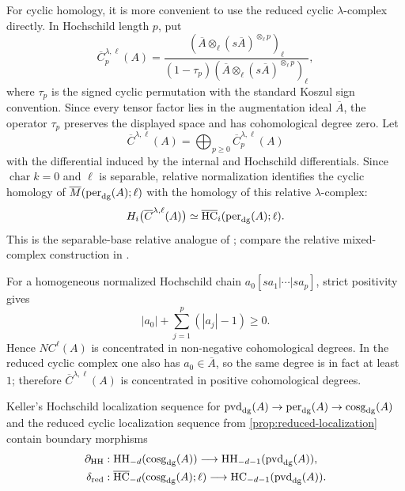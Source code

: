 \documentclass[11pt,a4paper,dvipsnames,x11names]{amsart}
\begin{document}
For cyclic homology, it is more convenient to use the reduced cyclic $\lambda$-complex directly. In Hochschild length $p$, put
\[
\overline C_p^{\lambda,\ell}(A)
=
\frac{\left(\overline A\otimes_{\ell}(s\overline A)^{\otimes_{\ell}p}\right)_{\ell}}
{(1-\tau_p)\left(\overline A\otimes_{\ell}(s\overline A)^{\otimes_{\ell}p}\right)_{\ell}},
\]
where $\tau_p$ is the signed cyclic permutation with the standard Koszul sign convention. Since every tensor factor lies in the augmentation ideal $\overline A$, the operator $\tau_p$ preserves the displayed space and has cohomological degree zero. Let
\[
\overline C^{\lambda,\ell}(A)=\bigoplus_{p\geq0}\overline C_p^{\lambda,\ell}(A)
\]
with the differential induced by the internal and Hochschild differentials. Since $\operatorname{char}k=0$ and $\ell$ is separable, relative normalization identifies the cyclic homology of $\overline M(\operatorname{per}_{\mathrm{dg}}(A);\ell)$ with the homology of this relative $\lambda$-complex:
\begin{equation}\label{eq:relative-HC-model}
H_i\bigl(\overline C^{\lambda,\ell}(A)\bigr)
\simeq
\overline{\operatorname{HC}}_i(\operatorname{per}_{\mathrm{dg}}(A);\ell).
\end{equation}
This is the separable-base relative analogue of \cite[Proposition~2.2.14]{Loday98}; compare the relative mixed-complex construction in \cite[Section~4.3]{KellerLiuAmiot24}.

For a homogeneous normalized Hochschild chain $a_0[sa_1|\cdots|sa_p]$, strict positivity gives
\begin{equation}\label{eq:normalized-degree}
|a_0|+\sum_{j=1}^p(|a_j|-1)\geq0.
\end{equation}
Hence $NC^{\ell}(A)$ is concentrated in non-negative cohomological degrees. In the reduced cyclic complex one also has $a_0\in\overline A$, so the same degree is in fact at least $1$; therefore $\overline C^{\lambda,\ell}(A)$ is concentrated in positive cohomological degrees.

Keller's Hochschild localization sequence for
$\operatorname{pvd}_{\mathrm{dg}}(A)\to\operatorname{per}_{\mathrm{dg}}(A)\to\operatorname{cosg}_{\mathrm{dg}}(A)$ and the reduced cyclic localization sequence from \cref{prop:reduced-localization} contain boundary morphisms
\begin{align}
\partial_{\mathrm{HH}}&:\operatorname{HH}_{-d}(\operatorname{cosg}_{\mathrm{dg}}(A))\longrightarrow\operatorname{HH}_{-d-1}(\operatorname{pvd}_{\mathrm{dg}}(A)),\label{eq:HH-boundary}\\
\delta_{\mathrm{red}}&:\overline{\operatorname{HC}}_{-d}(\operatorname{cosg}_{\mathrm{dg}}(A);\ell)\longrightarrow\operatorname{HC}_{-d-1}(\operatorname{pvd}_{\mathrm{dg}}(A)).\label{eq:reduced-boundary}
\end{align}
\end{document}
